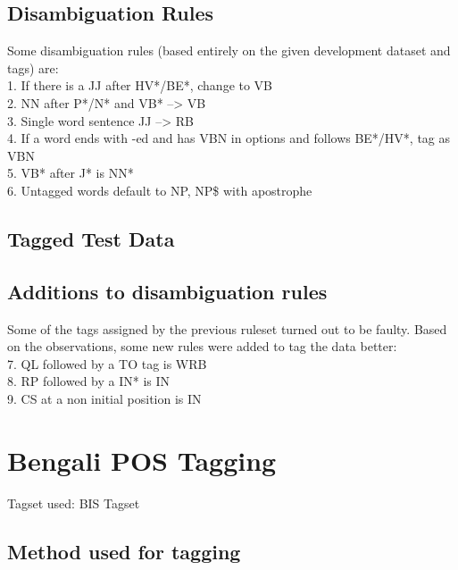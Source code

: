 \documentclass[11pt,a4paper,twocolumn]{article}
\begin{document}
	\subsection{Disambiguation Rules}
	Some disambiguation rules (based entirely on the given 
	development dataset and tags) are:\\
	1. If there is a JJ after HV*/BE*, change  to VB\\
	2. NN after P*/N* and VB* --> VB\\
	3. Single word sentence JJ --> RB\\
	4. If a word ends with -ed and has VBN in options and follows BE*/HV*, tag as VBN\\
	5. VB* after J* is NN*\\
	6. Untagged words default to NP, NP\$ with apostrophe\\


	\subsection{Tagged Test Data}	

	\subsection{Additions to disambiguation rules}
	Some of the tags assigned by the previous ruleset turned
	out to be faulty. Based on the observations, some new rules
	were added to tag the data better:\\
	7. QL followed by a TO tag is WRB\\
	8. RP followed by a IN* is IN\\
	9. CS at a non initial position is IN	\\
	\section{Bengali POS Tagging}
	Tagset used: BIS Tagset
	\subsection{Method used for tagging}
\end{document}
